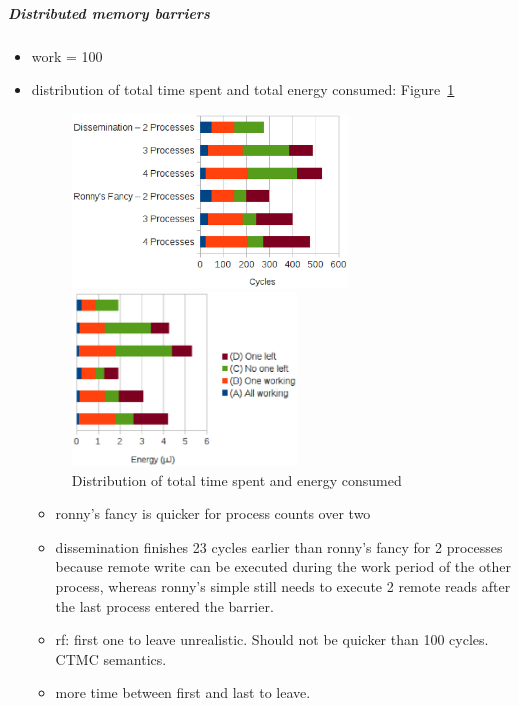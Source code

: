 \documentclass[a4paper, 10pt]{article}
\begin{document}
\subparagraph{Distributed memory barriers}
\label{sssssec:analysis-modelchecking-quantitative-properties-results-distributed}
\begin{itemize}
	\item work = 100
	\item distribution of total time spent and total energy consumed: Figure~\ref{fig:df-work-100-partition}
		\begin{figure}[htbp]
			\centering
			\begin{minipage}[b]{0.54\linewidth}
				\includegraphics[height=4.6cm]{charts/df-time-work-100-partition}
			\end{minipage}
			\begin{minipage}[b]{0.42\linewidth}
				\includegraphics[height=4.6cm]{charts/df-energy-work-100-partition}
			\end{minipage}
			\caption{Distribution of total time spent and energy consumed}
			\label{fig:df-work-100-partition}
		\end{figure}
		\begin{itemize}
			\item ronny's fancy is quicker for process counts over two
			\item dissemination finishes 23 cycles earlier than ronny's fancy for 2 processes because remote write can be executed during the work period of the other process, whereas ronny's simple still needs to execute 2 remote reads after the last process entered the barrier.
			\item rf: first one to leave unrealistic. Should not be quicker than 100 cycles. CTMC semantics.
			\item more time between first and last to leave.

\end{itemize}
\end{itemize}
\end{document}
